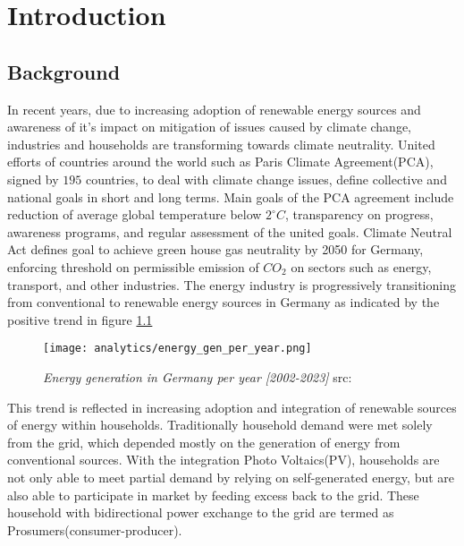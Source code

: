\chapter{Introduction}\label{ch-1}

\begin{large}

\section{Background}

In recent years, due to increasing adoption of renewable energy sources and awareness of it's impact on mitigation of issues caused by climate change, industries and households are transforming towards climate neutrality. United efforts of countries around the world such as Paris Climate Agreement\cite{parisagreement}(PCA), signed by $195$ countries, to deal with climate change issues, define collective and national goals in short and long terms. Main goals of the PCA agreement include reduction of average global temperature below $2^\circ C$, transparency on progress, awareness programs, and regular assessment of the united goals. Climate Neutral Act \cite{climateact} defines goal to achieve green house gas neutrality by 2050 for Germany, enforcing threshold on permissible emission of $CO_{2}$ on sectors such as energy, transport, and other industries. The energy industry is progressively transitioning from conventional to renewable energy sources in Germany as indicated by the positive trend in figure \ref{fig:energy_gen_de}\\

\begin{figure}[h]
	\begin{center}
		\texttt{[image: analytics/energy\_gen\_per\_year.png]}
		\caption{\textit{Energy generation in Germany per year [2002-2023]} src:\cite{energychartsinfo} }
		\label{fig:energy_gen_de}
	\end{center}
\end{figure}


This trend is reflected in increasing adoption and integration of renewable sources of energy within households. Traditionally household demand were met solely from the grid, which depended mostly on the generation of energy from conventional sources. With the integration Photo Voltaics(PV), households are not only able to meet partial demand by relying on self-generated energy, but are also able to participate in market by feeding excess back to the grid. These household with bidirectional power exchange to the grid are termed as Prosumers(consumer-producer).


\end{large}
